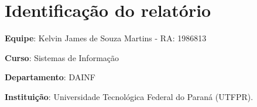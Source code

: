 \section{Identificação do relatório}

\vspace{20pt} \noindent

\vspace{20pt} 

\textbf{Equipe}: Kelvin James de Souza Martins - RA: 1986813\\
        \hspace*{65pt}{Rafael Lammel Marinheiro - RA: 1986856}

\vspace{20pt} 

\textbf{Curso}: Sistemas de Informação

\vspace{20pt}

\textbf{Departamento}: DAINF

\vspace{20pt} 

\textbf{Instituição}: Universidade Tecnológica Federal do Paraná (UTFPR).